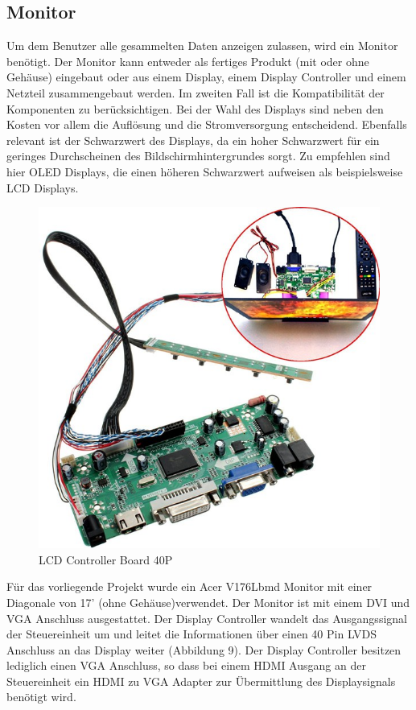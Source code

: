 \subsection{Monitor}
Um dem Benutzer alle gesammelten Daten anzeigen zulassen, wird ein Monitor benötigt. Der Monitor kann entweder als fertiges Produkt (mit oder ohne Gehäuse) eingebaut oder aus einem Display, einem Display Controller und einem Netzteil zusammengebaut werden. Im zweiten Fall ist die Kompatibilität der Komponenten zu berücksichtigen. Bei der Wahl des Displays sind neben den Kosten vor allem die Auflösung und die Stromversorgung entscheidend. Ebenfalls relevant ist der Schwarzwert des Displays, da ein hoher Schwarzwert für ein geringes Durchscheinen des Bildschirmhintergrundes sorgt. Zu empfehlen sind hier OLED Displays, die einen höheren Schwarzwert aufweisen als beispielsweise LCD Displays.  
\begin{figure}[H]
	\includegraphics[trim=0mm 0mm 0mm 0mm, scale=1]{bilder/dcontroller.jpg}
	\caption{LCD Controller Board 40P}
\end{figure}
Für das vorliegende Projekt wurde ein Acer V176Lbmd Monitor mit einer Diagonale von 17' (ohne Gehäuse)verwendet. Der Monitor ist mit einem DVI und VGA Anschluss ausgestattet. Der Display Controller wandelt das Ausgangssignal der Steuereinheit um und leitet die Informationen über einen 40 Pin LVDS Anschluss an das Display weiter (Abbildung 9). Der Display Controller besitzen lediglich einen VGA Anschluss, so dass bei einem HDMI Ausgang an der Steuereinheit ein HDMI zu VGA Adapter zur Übermittlung des Displaysignals benötigt wird.
 

